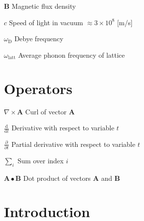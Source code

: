 \documentclass[12pt, a4paper, oneside]{article}
\begin{document}
\begin{abbreviations}
    \item [$\mathbf{B}$]                Magnetic flux density
    \item [$c$]                         Speed of light in vacuum $\approx 3\times10^8$ [m/s]
    \item [$\omega_{\mathrm{D}}$]       Debye frequency
    \item [$\omega_{\mathrm{latt}}$]    Average phonon frequency of lattice
\end{abbreviations}

\section*{Operators}

\begin{abbreviations}[style=multiline,leftmargin=3cm,font=\normalfont,itemsep=0pt,parsep=0.6\baselineskip,labelindent=5mm]
    \item [$\nabla \times \mathbf{A}$]                    Curl of vector $\mathbf{A}$
    \item [$\displaystyle\frac{\mbox{d}}{\mbox{d} t}$]    Derivative with respect to variable $t$
    \item [$\displaystyle\frac{\partial}{\partial t}$]    Partial derivative with respect to variable $t$
    \item [$\sum_i $]                                     Sum over index $i$
    \item [$\mathbf{A} \bullet \mathbf{B}$]               Dot product of vectors $\mathbf{A}$ and $\mathbf{B}$
\end{abbreviations}

\cleardoublepage


\setcounter{page}{1}
\onehalfspacing

\section{Introduction} \label{sec:intro}


\blindtext
\blinditemize
\blindtext
\end{document}
